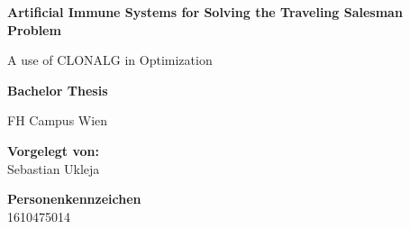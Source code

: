 \begin{center}

\vspace{1.3cm}

\hspace*{-1.0cm} {\Large \textbf{Artificial Immune Systems for Solving the Traveling Salesman Problem\\}}

\hspace*{-1.0cm} A use of CLONALG in Optimization \\

\vspace{2.2cm}

\hspace*{-1.0cm} \textbf{Bachelor Thesis\\}

\vspace{0.65cm}

\hspace*{-1.0cm} FH Campus Wien \\





\vspace{5cm}

\hspace*{-1.0cm} \textbf{Vorgelegt von:} \\
\hspace*{-1.0cm} Sebastian Ukleja \\

\vspace{0.65cm}

\hspace*{-1.0cm} \textbf{Personenkennzeichen}\\
\hspace*{-1.0cm} 1610475014 \\



\end{center}
